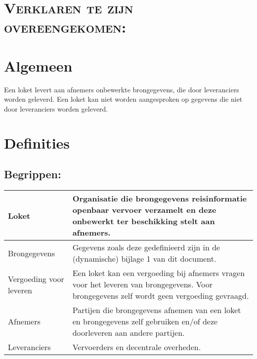 \documentclass[10pt, a4paper]{article}
\begin{document}
\section*{\textsc{Verklaren te zijn overeengekomen:}}
\section{Algemeen}
Een loket levert aan afnemers onbewerkte brongegevens, die door leveranciers worden geleverd.
Een loket kan niet worden aangesproken op gegevens die niet door leveranciers worden geleverd.
\newpage

\section{Definities}

\subsection*{Begrippen:}
\begin{tabular}{l|p{10cm}}
Loket                       & Organisatie die brongegevens reisinformatie openbaar vervoer verzamelt en deze onbewerkt ter beschikking stelt aan afnemers. \\
\hline
Brongegevens                & Gegevens zoals deze gedefinieerd zijn in de (dynamische) bijlage 1 van dit document. \\
\hline
Vergoeding voor leveren     & Een loket kan een vergoeding bij afnemers vragen voor het leveren van brongegevens. Voor brongegevens zelf wordt geen vergoeding gevraagd. \\
\hline
Afnemers                    & Partijen die brongegevens afnemen van een loket en brongegevens zelf gebruiken en/of deze doorleveren aan andere partijen. \\
\hline
Leveranciers                & Vervoerders en decentrale overheden. \\
\end{tabular}
\end{document}
